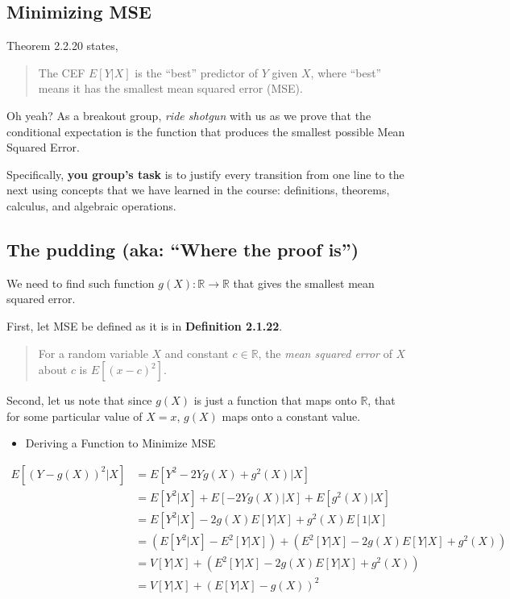 \documentclass[
]{book}
\providecommand{\tightlist}{%
  \setlength{\itemsep}{0pt}\setlength{\parskip}{0pt}}
\theoremstyle{definition}
\theoremstyle{definition}
\theoremstyle{definition}
\theoremstyle{definition}
\theoremstyle{remark}
\begin{document}
\hypertarget{minimizing-mse}{%
\subsection{Minimizing MSE}\label{minimizing-mse}}

Theorem 2.2.20 states,

\begin{quote}
The CEF \(E[Y|X]\) is the ``best'' predictor of \(Y\) given \(X\), where ``best'' means it has the smallest mean squared error (MSE).
\end{quote}

Oh yeah? As a breakout group, \emph{ride shotgun} with us as we prove that the conditional expectation is the function that produces the smallest possible Mean Squared Error.

Specifically, \textbf{you group's task} is to justify every transition from one line to the next using concepts that we have learned in the course: definitions, theorems, calculus, and algebraic operations.

\hypertarget{the-pudding-aka-where-the-proof-is}{%
\subsection{The pudding (aka: ``Where the proof is'')}\label{the-pudding-aka-where-the-proof-is}}

We need to find such function \(g(X): \mathbb{R} \to \mathbb{R}\) that gives the smallest mean squared error.

First, let MSE be defined as it is in \textbf{Definition 2.1.22}.

\begin{quote}
For a random variable \(X\) and constant \(c \in \mathbb{R}\), the \emph{mean squared error} of \(X\) about \(c\) is \(E[(x-c)^2]\).
\end{quote}

Second, let us note that since \(g(X)\) is just a function that maps onto \(\mathbb{R}\), that for some particular value of \(X=x\), \(g(X)\) maps onto a constant value.

\begin{itemize}
\tightlist
\item
  Deriving a Function to Minimize MSE
\end{itemize}

\[
\begin{aligned}
  E[(Y - g(X))^2|X]
      &= E[Y^2 - 2Yg(X) + g^2(X)|X]                                \\
      &= E[Y^2|X] + E[-2Yg(X)|X] + E[g^2(X)|X]                     \\
      &= E[Y^2|X] - 2g(X)E[Y|X] + g^2(X)E[1|X]                     \\
      &= (E[Y^2|X] - E^2[Y|X]) + (E^2[Y|X] - 2g(X)E[Y|X] + g^2(X)) \\
      &= V[Y|X] + (E^2[Y|X] - 2g(X)E[Y|X] + g^2(X))                \\
      &= V[Y|X] + (E[Y|X] - g(X))^2                                \\
\end{aligned} 
\]
\end{document}
